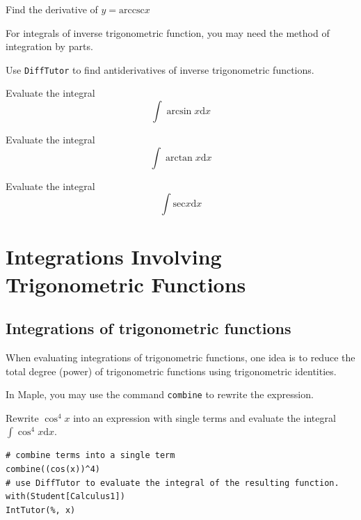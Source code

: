 \documentclass[]{book}
\theoremstyle{definition}
\theoremstyle{definition}
\theoremstyle{definition}
\theoremstyle{remark}
\let\BeginKnitrBlock\begin \let\EndKnitrBlock\end
\begin{document}
\BeginKnitrBlock{exercise}
\protect\hypertarget{exr:unnamed-chunk-7}{}{\label{exr:unnamed-chunk-7} }
Find the derivative of \(y=\mathrm{arccsc} x\)
\EndKnitrBlock{exercise}

For integrals of inverse trigonometric function, you may need the method of integration by parts.

Use \texttt{DiffTutor} to find antiderivatives of inverse trigonometric functions.

\BeginKnitrBlock{exercise}
\protect\hypertarget{exr:unnamed-chunk-8}{}{\label{exr:unnamed-chunk-8} }
Evaluate the integral
\[
\int \arcsin x \mathrm{d} x
\]
\EndKnitrBlock{exercise}

\BeginKnitrBlock{exercise}
\protect\hypertarget{exr:unnamed-chunk-9}{}{\label{exr:unnamed-chunk-9} }
Evaluate the integral
\[
\int \arctan x \mathrm{d} x
\]
\EndKnitrBlock{exercise}

\BeginKnitrBlock{exercise}
\protect\hypertarget{exr:unnamed-chunk-10}{}{\label{exr:unnamed-chunk-10} }
Evaluate the integral
\[
\int \mathrm{sec} x \mathrm{d} x
\]
\EndKnitrBlock{exercise}

\hypertarget{integrations-involving-trigonometric-functions}{%
\chapter{Integrations Involving Trigonometric Functions}\label{integrations-involving-trigonometric-functions}}

\hypertarget{integrations-of-trigonometric-functions}{%
\section{Integrations of trigonometric functions}\label{integrations-of-trigonometric-functions}}

When evaluating integrations of trigonometric functions, one idea is to reduce the total degree (power) of trigonometric functions using trigonometric identities.

In Maple, you may use the command \texttt{combine} to rewrite the expression.

\BeginKnitrBlock{example}
\protect\hypertarget{exm:unnamed-chunk-1}{}{\label{exm:unnamed-chunk-1} }
Rewrite \(\cos^4x\) into an expression with single terms and evaluate the integral \(\int \cos^4x\mathrm{d} x\).
\EndKnitrBlock{example}

\BeginKnitrBlock{solution}
{}

\begin{verbatim}
# combine terms into a single term
combine((cos(x))^4)
# use DiffTutor to evaluate the integral of the resulting function.
with(Student[Calculus1])
IntTutor(%, x)
\end{verbatim}
\EndKnitrBlock{solution}
\end{document}
